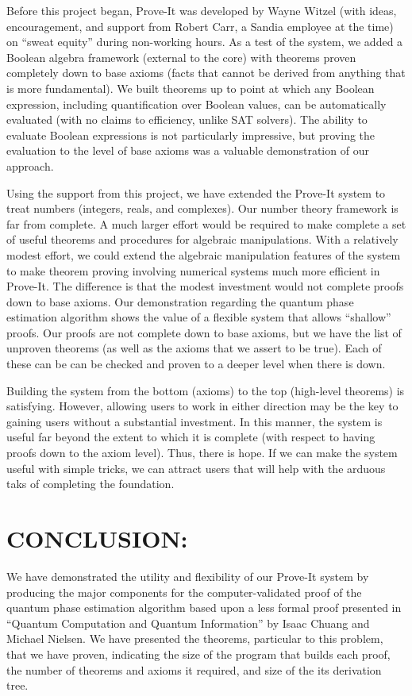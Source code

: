 \documentclass{article}[12pt]
\begin{document}
Before this project began, Prove-It was developed by Wayne Witzel (with ideas, encouragement, and support from Robert Carr, a Sandia employee at the time) on ``sweat equity'' during non-working hours.  As a test of the system, we added a Boolean algebra framework (external to the core) with theorems proven completely down to base axioms (facts that cannot be derived from anything that is more fundamental).  We built theorems up to point at which any Boolean expression, including quantification over Boolean values, can be automatically evaluated (with no claims to efficiency, unlike SAT solvers).  The ability to evaluate Boolean expressions is not particularly impressive, but proving the evaluation to the level of base axioms was a valuable demonstration of our approach.

Using the support from this project, we have extended the Prove-It system to treat numbers (integers, reals, and complexes).  Our number theory framework is far from complete.  A much larger effort would be required to make complete a set of useful theorems and procedures for algebraic manipulations.  With a relatively modest effort, we could extend the algebraic manipulation features of the system to make theorem proving involving numerical systems much more efficient in Prove-It.  The difference is that the modest investment would not complete proofs down to base axioms.  Our demonstration regarding the quantum phase estimation algorithm shows the value of a flexible system that allows ``shallow'' proofs.  Our proofs are not complete down to base axioms, but we have the list of unproven theorems (as well as the axioms that we assert to be true).  Each of these can be can be checked and proven to a deeper level when there is down.

Building the system from the bottom (axioms) to the top (high-level theorems) is satisfying.  However, allowing users to work in either direction may be the key to gaining users without a substantial investment.  In this manner, the system is useful far beyond the extent to which it is complete (with respect to having proofs down to the axiom level).  Thus, there is hope.  If we can make the system useful with simple tricks, we can attract users that will help with the arduous taks of completing the foundation.

\section*{CONCLUSION:}

We have demonstrated the utility and flexibility of our Prove-It system by producing the major components for the computer-validated proof of the quantum phase estimation algorithm based upon a less formal proof presented in ``Quantum Computation and Quantum Information'' by Isaac Chuang and Michael Nielsen.  We have presented the theorems, particular to this problem, that we have proven, indicating the size of the program that builds each proof, the number of theorems and axioms it required, and size of the its derivation tree.  
\end{document}
